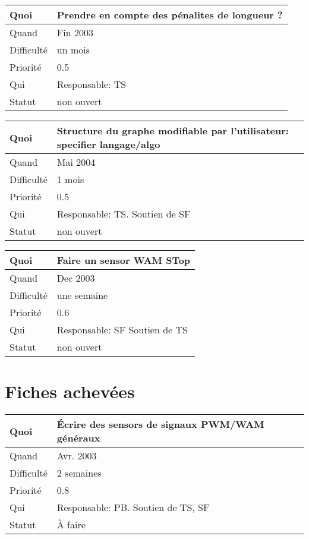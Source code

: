 \documentclass[a4paper,11pt]{article}
\begin{document}
\begin{longtable}{|l|p{7cm}|}\hline
  Quoi & Prendre en compte des p\'enalites de longueur ?\\\hline
  Quand  &  Fin 2003\\\hline
  Difficult\'e &  un mois \\\hline
  Priorit\'e & 0.5 \\\hline
  Qui & Responsable: TS\\\hline
  Statut & non ouvert\\\hline
\end{longtable}

\begin{longtable}{|l|p{7cm}|}\hline
  Quoi & Structure du graphe modifiable par l'utilisateur: specifier
langage/algo \\\hline
  Quand   & Mai 2004 \\\hline
  Difficult\'e & 1 mois \\\hline
  Priorit\'e &  0.5\\\hline
  Qui & Responsable: TS. Soutien de SF\\\hline
  Statut & non ouvert\\\hline
\end{longtable}

\begin{longtable}{|l|p{7cm}|}\hline
  Quoi & Faire un sensor WAM STop\\\hline
  Quand  &  Dec 2003\\\hline
  Difficult\'e & une semaine\\\hline
  Priorit\'e &  0.6\\\hline
  Qui & Responsable: SF  Soutien de TS\\\hline
  Statut & non ouvert\\\hline
\end{longtable}

\section{Fiches achev\'ees}

\begin{longtable}{|l|p{7cm}|}\hline
  Quoi & \'Ecrire des sensors de signaux PWM/WAM g\'en\'eraux\\\hline
  Quand  &  Avr. 2003\\\hline
  Difficult\'e &  2 semaines\\\hline
  Priorit\'e &  0.8 \\\hline
  Qui & Responsable: PB. Soutien de TS, SF\\\hline
  Statut & \`A faire\\\hline
\end{longtable}
\end{document}
